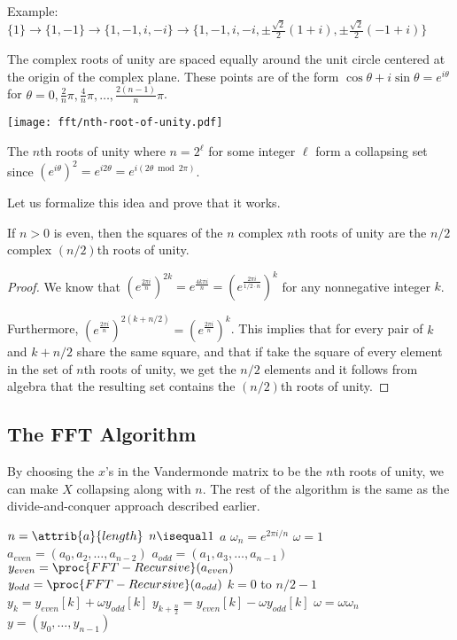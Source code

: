Example: $\{1\} \to \{1,-1\} \to \{1,-1,i,-i\} \to \{1,-1,i,-i,\pm \frac{\sqrt{2}}{2}(1+i),\pm \frac{\sqrt{2}}{2}(-1+i) \}$

The complex roots of unity are spaced equally around the unit circle centered at the origin of the complex plane. These points are of the form $\cos\theta + i\sin\theta = e^{i\theta}$ for $\theta = 0,\frac{2}{n}\pi,\frac{4}{n}\pi,\ldots,\frac{2(n-1)}{n}\pi$. 

\begin{center}
    \texttt{[image: fft/nth-root-of-unity.pdf]}
\end{center}

The $n$th roots of unity where $n=2^\ell$ for some integer $\ell$ form a collapsing set since $(e^{i\theta})^2 = e^{i 2\theta} = e^{i(2\theta \bmod 2\pi)}$. 

Let us formalize this idea and prove that it works.

\begin{lemma}
    If $n>0$ is even, then the squares of the $n$ complex $n$th roots of unity are the $n/2$ complex $(n/2)$th roots of unity. 
\end{lemma}

\begin{proof}
    We know that $\left(e^{\frac{2\pi i}{n}}\right)^{2k} = e^{\frac{4k\pi i}{n}} = \left(e^{\frac{2\pi i}{1/2 \cdot n}}\right)^k$ for any nonnegative integer $k$. 
    
    Furthermore, $\left(e^{\frac{2\pi i}{n}}\right)^{2(k+n/2)} = \left(e^{\frac{2\pi i}{n}}\right)^{k}$. This implies that for every pair of $k$ and $k+n/2$ share the same square, and that if take the square of every element in the set of $n$th roots of unity, we get the $n/2$ elements and it follows from algebra that the resulting set contains the $(n/2)$th roots of unity.
\end{proof}

\subsection{The FFT Algorithm} 

By choosing the $x$'s in the Vandermonde matrix to be the $n$th roots of unity, we can make $X$ collapsing along with $n$. The rest of the algorithm is the same as the divide-and-conquer approach described earlier.

\begin{codebox}
    \li $n = \attrib{a}{length}$
    \li \If $n \isequal 1$ \Then
        \li \Return $a$ 
    \End
    \li $\omega_n = e^{2\pi i/n}$
    \li $\omega = 1$
    \li $a_{even} = (a_0,a_2,\ldots,a_{n-2})$
    \li $a_{odd} = (a_1,a_3,\ldots,a_{n-1})$
    \li $y_{even} = \proc{FFT-Recursive}(a_{even})$
    \li $y_{odd} = \proc{FFT-Recursive}(a_{odd})$
    \li \For $k = 0$ to $n/2 - 1$ \Do
        \li $y_k = y_{even}[k] + \omega y_{odd}[k]$
        \li $y_{k+\frac{n}{2}} = y_{even}[k] - \omega y_{odd}[k]$
        \li $\omega = \omega \omega_n$
    \End
    \li \Return $y = (y_0,\ldots,y_{n-1})$      
\end{codebox}

